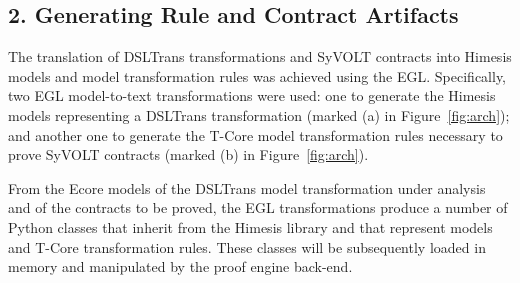 \subsection*{2. Generating Rule and Contract Artifacts}
\label{sec:gen_models_mt}

The translation of DSLTrans transformations and SyVOLT contracts into Himesis
models and model transformation rules was achieved using the EGL. Specifically, two EGL model-to-text
transformations were used: one to generate the Himesis models
representing a DSLTrans transformation (marked (a) in Figure~\ref{fig:arch});
and another one to generate the T-Core model transformation rules necessary to prove
SyVOLT contracts (marked (b) in Figure~\ref{fig:arch}).

From the Ecore models of the DSLTrans model transformation under analysis and
of the contracts to be proved, the EGL transformations produce a number of Python
classes that inherit from the Himesis library and that represent models and
T-Core transformation rules. These classes will be subsequently loaded in memory
and manipulated by the proof engine back-end.


